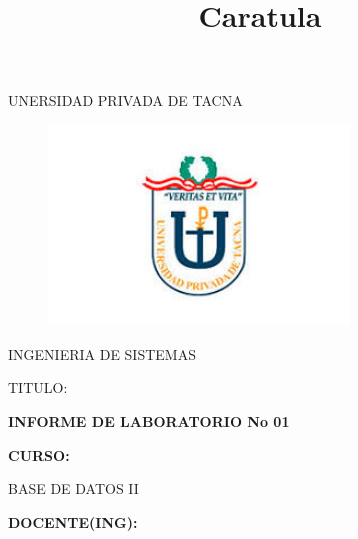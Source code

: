 \documentclass[12pt,letterpaper]{article}
\begin{document}
%


\title{Caratula}

\begin{titlepage}
\begin{center}
\large{UNERSIDAD PRIVADA DE TACNA}\\
\vspace*{-0.025in}
\begin{figure}[htb]
\begin{center}
\includegraphics[width=8cm]{./Imagenes/logo}
\end{center}
\end{figure}
\vspace*{0.15in}
INGENIERIA DE SISTEMAS  \\

\vspace*{0.5in}
\begin{large}
TITULO:\\
\end{large}

\vspace*{0.1in}
\begin{Large}
\textbf{INFORME DE LABORATORIO No 01} \\
\end{Large}

\vspace*{0.3in}
\begin{Large}
\textbf{CURSO:} \\
\end{Large}

\vspace*{0.1in}
\begin{large}
BASE DE DATOS II\\
\end{large}

\vspace*{0.3in}
\begin{Large}
\textbf{DOCENTE(ING):} \\
\end{Large}


\end{center}
\end{titlepage}
\end{document}
